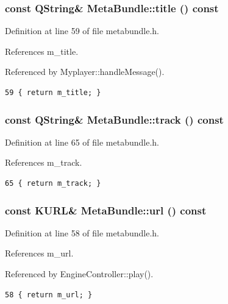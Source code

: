 \subsubsection{\setlength{\rightskip}{0pt plus 5cm}const QString\& Meta\-Bundle::title () const\hspace{0.3cm}{\tt  [inline]}}\label{classMetaBundle_MetaBundlea10}




Definition at line 59 of file metabundle.h.

References m\_\-title.

Referenced by Myplayer::handle\-Message().



\footnotesize\begin{verbatim}59 { return m_title; }
\end{verbatim}\normalsize 
{}
\subsubsection{\setlength{\rightskip}{0pt plus 5cm}const QString\& Meta\-Bundle::track () const\hspace{0.3cm}{\tt  [inline]}}\label{classMetaBundle_MetaBundlea16}




Definition at line 65 of file metabundle.h.

References m\_\-track.



\footnotesize\begin{verbatim}65 { return m_track; }
\end{verbatim}\normalsize 
{}
\subsubsection{\setlength{\rightskip}{0pt plus 5cm}const KURL\& Meta\-Bundle::url () const\hspace{0.3cm}{\tt  [inline]}}\label{classMetaBundle_MetaBundlea9}




Definition at line 58 of file metabundle.h.

References m\_\-url.

Referenced by Engine\-Controller::play().



\footnotesize\begin{verbatim}58 { return m_url; }
\end{verbatim}\normalsize 
{}
